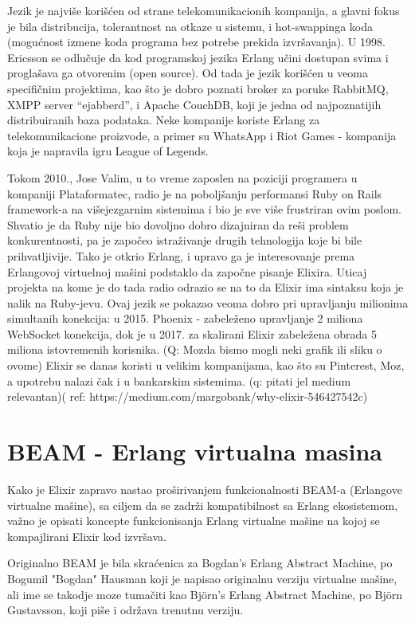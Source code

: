 \documentclass[a4paper]{article}
\begin{document}
Jezik je najviše korišćen od strane telekomunikacionih kompanija, a glavni fokus je bila distribucija, tolerantnost na otkaze u sistemu, i hot-swappinga koda (mogućnost izmene koda programa bez potrebe prekida izvršavanja). U 1998. Ericsson se odlučuje da kod programskoj jezika Erlang učini dostupan svima i proglašava ga otvorenim (open source). Od tada je jezik korišćen u veoma specifičnim projektima, kao što je dobro poznati broker za poruke RabbitMQ, XMPP server “ejabberd”, i Apache CouchDB, koji je jedna od najpoznatijih distribuiranih baza podataka. Neke kompanije koriste Erlang za telekomunikacione proizvode, a primer su WhatsApp i Riot Games - kompanija koja je napravila igru League of Legends.

Tokom 2010., Jose Valim, u to vreme zaposlen na poziciji programera u kompaniji Plataformatec, radio je na poboljšanju performansi Ruby on Rails framework-a na višejezgarnim sistemima i bio je sve više frustriran ovim poslom. Shvatio je da Ruby nije bio dovoljno dobro dizajniran da reši problem konkurentnosti, pa je započeo istraživanje drugih tehnologija koje bi bile prihvatljivije. Tako je otkrio Erlang, i upravo ga je interesovanje prema Erlangovoj virtuelnoj mašini podstaklo da započne pisanje Elixira. Uticaj projekta na kome je do tada radio odrazio se na to da Elixir ima sintaksu koja je nalik na Ruby-jevu. Ovaj jezik se pokazao veoma dobro pri upravljanju milionima simultanih konekcija: u 2015. Phoenix - zabeleženo upravljanje 2 miliona WebSocket konekcija, dok je u 2017. za skalirani Elixir zabeležena obrada 5 miliona istovremenih korisnika. (Q: Mozda bismo mogli neki grafik ili sliku o ovome) Elixir se danas koristi u velikim kompanijama, kao što su Pinterest, Moz, a upotrebu nalazi čak i u bankarskim sistemima. (q: pitati jel medium relevantan)( ref: https://medium.com/margobank/why-elixir-546427542c)

\section{BEAM - Erlang virtualna masina}

Kako je Elixir zapravo nastao pro\v{s}irivanjem funkcionalnosti BEAM-a (Erlangove virtualne ma\v{s}ine), sa ciljem da se zadr\v{z}i kompatibilnost sa Erlang ekosistemom, va\v{z}no je opisati koncepte funkcionisanja Erlang virtualne ma\v{s}ine na kojoj se  kompajlirani Elixir kod izvr\v{s}ava.

Originalno BEAM je bila skra\'{c}enica za Bogdan's Erlang Abstract Machine, po Bogumil "Bogdan" Hausman koji je napisao originalnu verziju virtualne ma\v{s}ine, ali ime se takodje moze tuma\v{c}iti kao Björn's Erlang Abstract Machine, po Björn Gustavsson, koji pi\v{s}e i odr\v{z}ava trenutnu verziju.
\end{document}
